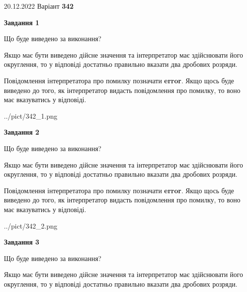 \documentclass[12pt, ukrainian]{article}
\begin{document}
{20.12.2022 Варіант \No \textbf { 342 }\par}
{
\begin {Large}

{\begin {center}\textbf{Завдання 1}\end {center}}\par
Що буде виведено за виконання? \par

Якщо має бути виведено дійсне значення та інтерпретатор має здійснювати його округлення, 
то у відповіді достатньо правильно вказати два дробових розряди.

Повідомлення інтерпретатора про помилку позначати \textbf{error}.
Якщо щось буде виведено до того, як інтерпретатор видасть повідомлення про помилку, 
то воно має вказуватись у відповіді. \par

\begin{center}
	{../pict/342_1.png}
\end{center}
\newpage

{\begin {center}\textbf{Завдання 2}\end {center}}\par
Що буде виведено за виконання? \par

Якщо має бути виведено дійсне значення та інтерпретатор має здійснювати його округлення, 
то у відповіді достатньо правильно вказати два дробових розряди.

Повідомлення інтерпретатора про помилку позначати \textbf{error}.
Якщо щось буде виведено до того, як інтерпретатор видасть повідомлення про помилку, 
то воно має вказуватись у відповіді. \par

\begin{center}
	{../pict/342_2.png}
\end{center}
\newpage

{\begin {center}\textbf{Завдання 3}\end {center}}\par
Що буде виведено за виконання? \par

Якщо має бути виведено дійсне значення та інтерпретатор має здійснювати його округлення, 
то у відповіді достатньо правильно вказати два дробових розряди.


\end{Large}}
\end{document}
